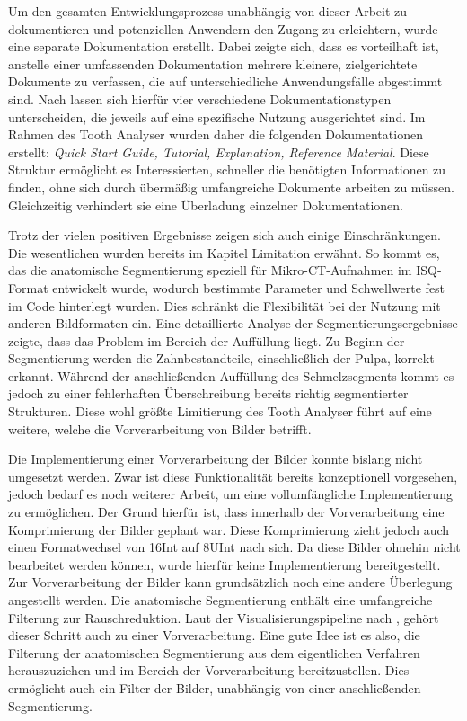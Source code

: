 Um den gesamten Entwicklungsprozess unabhängig von dieser Arbeit zu dokumentieren
und potenziellen Anwendern den Zugang zu erleichtern, wurde eine separate
Dokumentation erstellt. Dabei zeigte sich, dass es vorteilhaft ist, anstelle einer
umfassenden Dokumentation mehrere kleinere, zielgerichtete Dokumente zu
verfassen, die auf unterschiedliche Anwendungsfälle abgestimmt sind. Nach \citet{procida2017}
lassen sich hierfür vier verschiedene Dokumentationstypen unterscheiden, die
jeweils auf eine spezifische Nutzung ausgerichtet sind. Im Rahmen des Tooth Analyser
wurden daher die folgenden Dokumentationen erstellt: \textit{Quick Start Guide, Tutorial,
Explanation, Reference Material}. Diese Struktur ermöglicht es Interessierten, schneller
die benötigten Informationen zu finden, ohne sich durch übermäßig umfangreiche
Dokumente arbeiten zu müssen. Gleichzeitig verhindert sie eine Überladung einzelner
Dokumentationen.

Trotz der vielen positiven Ergebnisse zeigen sich auch einige Einschränkungen.
Die wesentlichen wurden bereits im Kapitel Limitation erwähnt. So kommt es, das
die anatomische Segmentierung speziell für Mikro-\ac{CT}-Aufnahmen im \ac{ISQ}-Format
entwickelt wurde, wodurch bestimmte Parameter und Schwellwerte fest im Code hinterlegt
wurden. Dies schränkt die Flexibilität bei der Nutzung mit anderen Bildformaten
ein. Eine detaillierte Analyse der Segmentierungsergebnisse zeigte, dass das
Problem im Bereich der Auffüllung liegt. Zu Beginn der Segmentierung werden die Zahnbestandteile,
einschließlich der Pulpa, korrekt erkannt. Während der anschließenden Auffüllung
des Schmelzsegments kommt es jedoch zu einer fehlerhaften Überschreibung bereits
richtig segmentierter Strukturen. Diese wohl größte Limitierung des Tooth Analyser
führt auf eine weitere, welche die Vorverarbeitung von Bilder betrifft.

Die Implementierung einer Vorverarbeitung der Bilder konnte bislang nicht
umgesetzt werden. Zwar ist diese Funktionalität bereits konzeptionell vorgesehen,
jedoch bedarf es noch weiterer Arbeit, um eine vollumfängliche Implementierung zu
ermöglichen. Der Grund hierfür ist, dass innerhalb der Vorverarbeitung eine Komprimierung
der Bilder geplant war. Diese Komprimierung zieht jedoch auch einen
Formatwechsel von \ac{16Int} auf \ac{8UInt} nach sich. Da diese Bilder ohnehin nicht
bearbeitet werden können, wurde hierfür keine Implementierung bereitgestellt. Zur
Vorverarbeitung der Bilder kann grundsätzlich noch eine andere Überlegung angestellt
werden. Die anatomische Segmentierung enthält eine umfangreiche Filterung zur
Rauschreduktion. Laut der Visualisierungspipeline nach \citet[S.~50]{handels2000},
gehört dieser Schritt auch zu einer Vorverarbeitung. Eine gute Idee ist es also,
die Filterung der anatomischen Segmentierung aus dem eigentlichen Verfahren herauszuziehen
und im Bereich der Vorverarbeitung bereitzustellen. Dies ermöglicht auch ein
Filter der Bilder, unabhängig von einer anschließenden Segmentierung.

